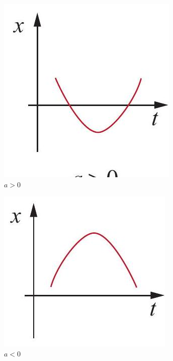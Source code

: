 \documentclass[10pt]{article}
\begin{document}
\includegraphics[max width=\textwidth, center]{2024_09_14_9969b06773f10b6936e8g-055(2)}\\
$a>0$

\includegraphics[max width=\textwidth, center]{2024_09_14_9969b06773f10b6936e8g-055}\\
$a<0$
\end{document}
